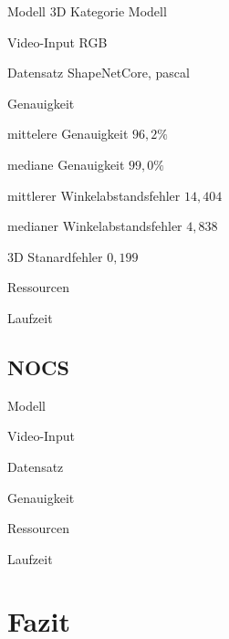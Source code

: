 \documentclass[a4paper, 11pt]{article}
\begin{document}
\begin{multicols*}{2}
    \begin{description*}
        \item[Modell] 3D Kategorie Modell
        \item[Video-Input] RGB
        \item[Datensatz] \Gls{ShapeNetCore}, \Gls{pascal}
        \item[Genauigkeit]
        \begin{itemize*}
            \item mittelere Genauigkeit $96,2\%$
            \item mediane Genauigkeit $99,0\%$
            \item mittlerer Winkelabstandsfehler $14,404$
            \item medianer Winkelabstandsfehler $4,838$
            \item 3D Stanardfehler $0,199$
        \end{itemize*}
        \item[Ressourcen]
        \item[Laufzeit]
    \end{description*}

    \subsection{NOCS}

    \begin{description*}
        \item[Modell]
        \item[Video-Input]
        \item[Datensatz]
        \item[Genauigkeit]
        \begin{itemize*}
            \item
        \end{itemize*}
        \item[Ressourcen]
        \item[Laufzeit]
    \end{description*}


    \section{Fazit}

\end{multicols*}
\end{document}
